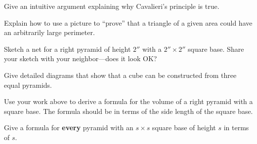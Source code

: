 \begin{prob}
Give an intuitive argument explaining why Cavalieri's principle is
true.
\end{prob}


\begin{prob}
Explain how to use a picture to ``prove'' that a triangle of a given
  area could have an arbitrarily large perimeter.
\end{prob}



\begin{prob}
Sketch a net for a right pyramid of height $2''$ with a $2'' \times
2''$ square base. Share your sketch with your neighbor---does it look
OK?
\end{prob}


\begin{prob}
Give detailed diagrams that show that a cube can be constructed from
three equal pyramids.
\end{prob}

\begin{prob}
Use your work above to derive a formula for the volume of a
right pyramid with a square base. The formula should be in terms of
the side length of the square base.
\end{prob}

\begin{prob}
Give a formula for \textbf{every} pyramid with an $s\times s$ square base of height $s$ in terms of $s$. 
\end{prob}


